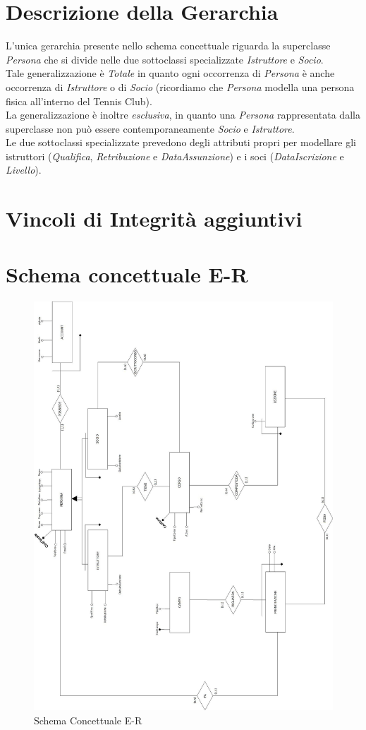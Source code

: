 \section{Descrizione della Gerarchia}
L'unica gerarchia presente nello schema concettuale riguarda la superclasse \textit{Persona} che si divide nelle due sottoclassi specializzate \textit{Istruttore} e \textit{Socio}.\\

Tale generalizzazione è \textit{Totale} in quanto ogni occorrenza di \textit{Persona} è anche occorrenza di \textit{Istruttore} o di \textit{Socio} (ricordiamo che \textit{Persona} modella una persona fisica all'interno del Tennis Club).\\
La generalizzazione è inoltre \textit{esclusiva}, in quanto una \textit{Persona} rappresentata dalla superclasse non può essere contemporaneamente \textit{Socio} e \textit{Istruttore}.\\

Le due sottoclassi specializzate prevedono degli attributi propri per modellare gli istruttori (\textit{Qualifica}, \textit{Retribuzione} e \textit{DataAssunzione}) e i soci (\textit{DataIscrizione} e \textit{Livello}).

\section{Vincoli di Integrità aggiuntivi}
\section{Schema concettuale E-R}
\begin{figure}[H]
 \centering
  \includegraphics[width=\textwidth, height=\textheight]{Images/ER_FINALE.jpg}
\caption{Schema Concettuale E-R}
\end{figure}